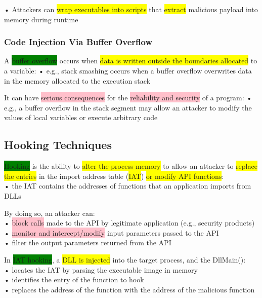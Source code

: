 \documentclass[]{project_plan}
\begin{document}
• Attackers can \colorbox{yellow}{wrap executables into scripts} that \colorbox{yellow}{extract} malicious payload into memory
during runtime

\subsubsection{Code Injection Via Buffer Overflow}

A \colorbox{green}{buffer overflow} occurs when \colorbox{yellow}{data is written outside the boundaries allocated} to a
variable:
• e.g., stack smashing occurs when a buffer overflow overwrites data in the memory allocated to the execution
stack

It can have \colorbox{pink}{serious consequences} for the \colorbox{pink}{reliability and security} of a program:
• e.g., a buffer overflow in the stack segment may allow an attacker to modify the values of local variables or
execute arbitrary code

\subsection{Hooking Techniques}

\colorbox{green}{Hooking} is the ability to \colorbox{yellow}{alter the process memory} to allow an attacker to \colorbox{yellow}{replace the entries} in
the import address table (\colorbox{yellow}{IAT}) \colorbox{yellow}{or modify API functions}:\\
• the IAT contains the addresses of functions that an application imports from DLLs

By doing so, an attacker can:\\
• \colorbox{pink}{block calls} made to the API by legitimate application (e.g., security products)\\
• \colorbox{pink}{monitor and intercept/modify} input parameters passed to the API\\
• filter the output parameters returned from the API

In \colorbox{green}{IAT hooking}, a \colorbox{yellow}{DLL is injected} into the target process, and the DllMain():\\
• locates the IAT by parsing the executable image in memory\\
• identifies the entry of the function to hook\\
• replaces the address of the function with the address of the malicious function
\end{document}
